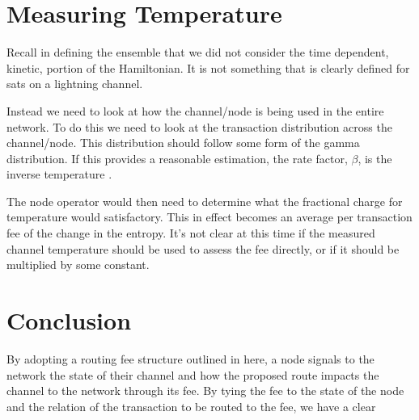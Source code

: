 \documentclass[review,12pt]{elsarticle}
\begin{document}
\section{Measuring Temperature}
Recall in defining the ensemble that we did not consider the time dependent, kinetic, portion of the Hamiltonian.
It is not something that is clearly defined for sats on a lightning channel.

Instead we need to look at how the channel/node is being used in the entire network.
To do this we need to look at the transaction distribution across the channel/node.
This distribution should follow some form of the gamma distribution.
If this provides a reasonable estimation, the rate factor, $\beta$, is the inverse temperature \cite[p.~76]{Gibbs:1902}.

The node operator would then need to determine what the fractional charge for temperature would satisfactory.
This in effect becomes an average per transaction fee of the change in the entropy.
It's not clear at this time if the measured channel temperature should be used to assess the fee directly, or if it should be multiplied by some constant.

\section{Conclusion}
By adopting a routing fee structure outlined in here, a node signals to the network the state of their channel and how the proposed route impacts the channel to the network through its fee.
By tying the fee to the state of the node and the relation of the transaction to be routed to the fee, we have a clear




\end{document}
